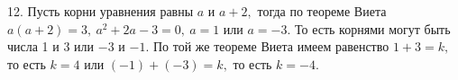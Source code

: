 12. Пусть корни уравнения равны $a$ и $a+2,$ тогда по теореме Виета $a(a+2)=3,\ a^2+2a-3=0,\ a=1$ или $a=-3.$ То есть корнями могут быть числа 1 и 3 или $-3$ и $-1.$ По той же теореме Виета имеем равенство $1+3=k,$ то есть $k=4$ или $(-1)+(-3)=k,$ то есть $k=-4.$\\

